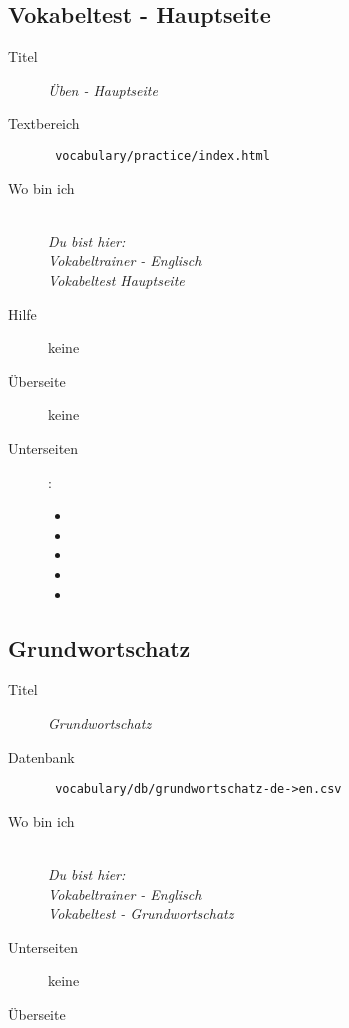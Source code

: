 \subsection{ Vokabeltest - Hauptseite }
\label{has:voc-practice-page0}
\begin{description}
	\item[Titel] \emph{ Üben - Hauptseite }
	\item[Textbereich] \texttt{ vocabulary/practice/index.html }
	\item[Wo bin ich] \emph{\\Du bist hier:\\Vokabeltrainer - Englisch\\Vokabeltest Hauptseite}
	\item[Hilfe] keine
	\item[Überseite] keine
	\item[Unterseiten] :
	\begin{itemize}
		\item {}
		\item {}
		\item {}
		\item {}
		\item {}
	\end{itemize}
\end{description}

\subsection{ Grundwortschatz }
\label{has:voc-practice-page1}
\begin{description}
	\item[Titel] \emph{ Grundwortschatz }
	\item[Datenbank] \texttt{ vocabulary/db/grundwortschatz-de->en.csv }
	\item[Wo bin ich] \emph{\\Du bist hier:\\Vokabeltrainer - Englisch\\Vokabeltest - Grundwortschatz}
	\item[Unterseiten] keine
	\item[Überseite] 
\end{description}

